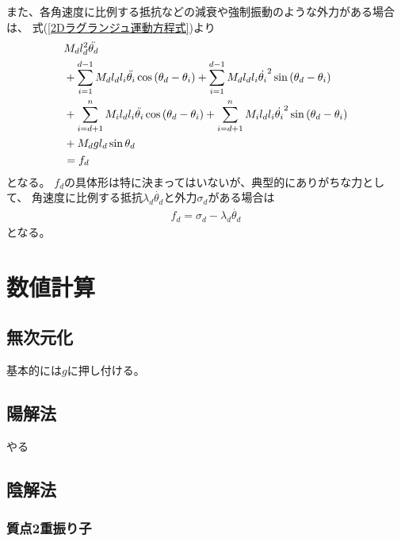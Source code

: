 \documentclass{jsarticle}
\newcommand{\eqa}[1]{\begin{align}#1\end{align}}
\newcommand{\refeq}[1]{式(\ref{#1})}
\newcommand{\cost}[2]{\cos\left(\theta_{#1}-\theta_{#2}\right)}
\newcommand{\sint}[2]{\sin\left(\theta_{#1}-\theta_{#2}\right)}
\newcommand{\dott}[1]{\dot{\theta_{#1}}}
\newcommand{\ddott}[1]{\ddot{\theta_{#1}}}
\begin{document}
また、各角速度に比例する抵抗などの減衰や強制振動のような外力がある場合は、
\refeq{2Dラグランジュ運動方程式}より
\eqa{
	&M_d l_d^2 \ddott{d} \notag\\
		&+ \sum_{i=1}^{d-1} M_d l_d l_i \ddott{i} \cost{d}{i}
			+ \sum_{i=1}^{d-1} M_d l_d l_i \dott{i}^2 \sint{d}{i} \notag\\
		&+ \sum_{i=d+1}^n M_i l_d l_i \ddott{i} \cost{d}{i}
			+ \sum_{i=d+1}^n M_i l_d l_i \dott{i}^2 \sint{d}{i} \notag\\
		&+ M_d g l_d \sin\theta_d \notag\\
	&= f_d
}
となる。
$f_d$の具体形は特に決まってはいないが、典型的にありがちな力として、
角速度に比例する抵抗$\lambda_d \dott{d}$と外力$\sigma_d$がある場合は
\eqa{
	f_d = \sigma_d - \lambda_d \dott{d}
}
となる。

\section{数値計算}

\subsection{無次元化}

基本的には$g$に押し付ける。

\subsection{陽解法}

やる

\subsection{陰解法}

\subsubsection{質点2重振り子}
\end{document}

